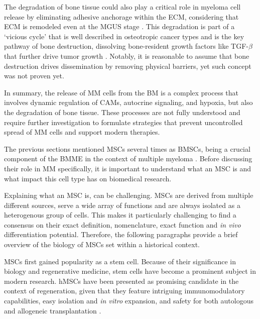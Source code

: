 The degradation of bone tissue could also play a critical role in myeloma cell
release by eliminating adhesive anchorage within the ECM, considering that
\ac{ECM} is remodeled even at the \ac{MGUS} stage
\citet{glaveyProteomicCharacterizationHuman2017}. This degradation is part of a
‘vicious cycle' that is well described in osteotropic cancer types and is the
key pathway of bone destruction, dissolving bone-resident growth factors like
TGF-$\beta$ that further drive tumor growth
\cite{haradaMyelomaBoneInteraction2021, siclariMolecularInteractionsBreast2007,
    wangProstateCancerPromotes2019}. Notably, it is reasonable to assume that bone
destruction drives dissemination by removing physical barriers, yet such concept
was not proven yet.


In summary, the release of \ac{MM} cells from the \ac{BM} is a complex process
that involves dynamic regulation of \acp{CAM}, autocrine signaling, and hypoxia,
but also the degradation of bone tissue. These processes are not fully
understood and require further investigation to formulate strategies that
prevent uncontrolled spread of \ac{MM} cells and support modern therapies.







%
\label{sec:intro_hMSCs}%
The previous sections mentioned \acp{MSC} several times as \acp{BMSC}, being a
crucial component of the \ac{BMME} in the context of multiple myeloma
\cite{mangoliniBoneMarrowStromal2020}. Before discussing their role in \ac{MM}
specifically, it is important to understand what an \ac{MSC} is and what impact
this cell type has on biomedical research.

Explaining what an \ac{MSC} is, can be challenging. MSCs
are derived from multiple different sources, serve a wide array of functions and
are always isolated as a heterogenous group of cells. This makes it particularly
challenging to find a consensus on their exact definition, nomenclature, exact
function and \textit{in vivo} differentiation potential. Therefore, the
following paragraphs provide a brief overview of the biology of MSCs set within
a historical context.


\acp{MSC} first gained popularity as a stem cell. Because of their significance
in biology and regenerative medicine, stem cells have become a prominent subject
in modern research. \acp{hMSC} have been presented as promising candidate in the
context of regeneration, given that they feature intriguing immunomodulatory
capabilities, easy isolation and \textit{in vitro} expansion, and safety for
both autologous and allogeneic transplantation
\cite{ullahHumanMesenchymalStem2015}.



